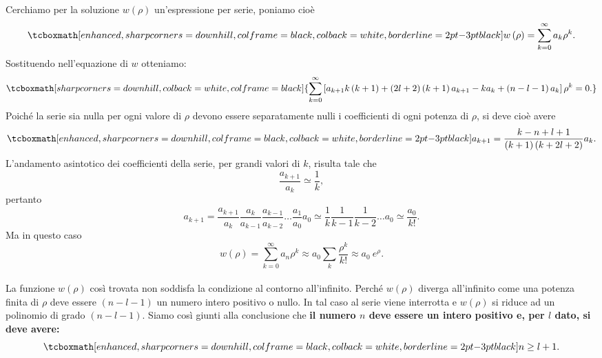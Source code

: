 \documentclass[a4paper,12pt,oneside]{book}
\begin{document}
Cerchiamo per la soluzione $w\left(\rho\right)$ un'espressione per serie, poniamo cioè 
	\begin{equation}
		\tcboxmath[enhanced, sharp corners=downhill, colframe=black, colback=white, borderline={2pt}{-3pt}{black}]{
			w\left(\rho\right)=\sum_{k=0}^\infty a_k \rho^k .
			}
	\end{equation}
Sostituendo nell'equazione di $w$ otteniamo:
	\begin{equation}
		\tcboxmath[sharp corners=downhill, colback=white, colframe=black]{
			\sum_{k=0}^\infty\left[a_{k+1}k\left(k+1\right)+\left(2l+2\right)\left(k+1\right)a_{k+1}-ka_k+\left(n-l-1\right)a_k\right]\rho^k=0 .
			}
	\end{equation}
Poiché la serie sia nulla per ogni valore di $\rho$ devono essere separatamente nulli i coefficienti di ogni potenza di $\rho$, si deve cioè avere
	\begin{equation}
		\tcboxmath[enhanced, sharp corners=downhill, colframe=black, colback=white, borderline={2pt}{-3pt}{black}]{
			a_{k+1}=\frac{k-n+l+1}{\left(k+1\right)\left(k+2l+2\right)}a_k .
			}
	\end{equation}
L'andamento asintotico dei coefficienti della serie, per grandi valori di $k$, risulta tale che
	\begin{equation}
		\frac{a_{k+1}}{a_k}\simeq \frac{1}{k},
	\end{equation}
pertanto
	\begin{equation}
		a_{k+1}=\frac{a_{k+1}}{a_{k}}\frac{a_{k}}{a_{k-1}}\frac{a_{k-1}}{a_{k-2}}\dots \frac{a_{1}}{a_{0}}a_0  \simeq \frac{1}{k} \frac{1}{k-1}\frac{1}{k-2}\dots a_0\simeq \frac{a_0}{k!}  .
	\end{equation}
Ma in questo caso
	\begin{equation}
		w(\rho) =\sum _{k=0} ^{\infty} a_n\rho ^k \approx a_0 \sum _k \frac{\rho ^k}{k!} \approx a_0\ e^{\rho}.
	\end{equation}\\

La funzione $w (\rho )$ così trovata non soddisfa la condizione al contorno all'infinito. Perché $w(\rho )$ diverga all'infinito come una potenza finita di $\rho$ deve essere $(n-l-1)$ un numero intero positivo o nullo. In tal caso al serie viene interrotta e $w (\rho )$ si riduce ad un polinomio di grado $(n-l-1)$. Siamo così giunti alla conclusione che \textbf{il numero $n$ deve essere un intero positivo e, per $l$ dato, si deve avere:}
	\begin{equation}
		\tcboxmath[enhanced, sharp corners=downhill, colframe=black, colback=white, borderline={2pt}{-3pt}{black}]{
			n \geq l+1.
			}
	\end{equation}\\
	
\end{document}
